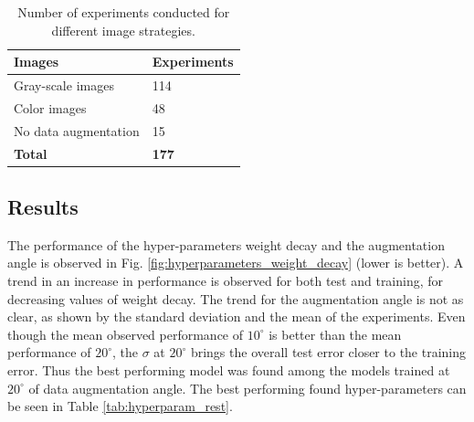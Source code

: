 \begin{table}[]
\centering
\begin{tabular}{@{}ll@{}}
\toprule
\textbf{Images} & \textbf{Experiments} \\ \midrule
Gray-scale images            & 114                  \\
Color images                 & 48                   \\
No data augmentation         & 15                   \\ \midrule
\textbf{Total}               & \textbf{177}         \\ \bottomrule
\end{tabular}
\caption{Number of experiments conducted for different image strategies.}\label{tab:experiments}
\end{table}


\subsection{Results}

The performance of the hyper-parameters weight decay and the augmentation angle is observed in Fig. \ref{fig:hyperparameters_weight_decay} (lower is better). A trend in an increase in performance is observed for both test and training, for decreasing values of weight decay. The trend for the augmentation angle is not as clear, as shown by the standard deviation and the mean of the experiments. Even though the mean observed performance of $10^{\circ}$ is better than the mean performance of $20^{\circ}$, the $\sigma$ at $20^{\circ}$ brings the overall test error closer to the training error. Thus the best performing model was found among the models trained at $20^{\circ}$ of data augmentation angle. The best performing found hyper-parameters can be seen in Table \ref{tab:hyperparam_rest}.




